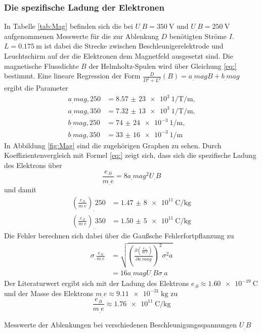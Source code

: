 \subsubsection{Die spezifische Ladung der Elektronen}
In Tabelle \ref{tab:Mag} befinden sich die bei $U_.B=\SI{350}{\volt}$ und $U_.B=\SI{250}{\volt}$ aufgenommenen Messwerte für die zur Ablenkung $D$ benötigten Ströme $I$.
$L=\SI{0,175}{\metre}$\cite{V501} ist dabei die Strecke zwischen Beschleunigerelektrode und Leuchtschirm auf der die Elektronen dem Magnetfeld ausgesetzt sind.
Die magnetische Flussdichte $B$ der Helmholtz-Spulen wird über Gleichung \eqref{eq:} bestimmt.
Eine lineare Regression der Form $\frac{D}{D^2+L^2}(B)=a_.{mag}B+b_.{mag}$ ergibt die Parameter
\begin{align*}
a_.{mag,250}&=\SI{8,57(23)e3}{1\per\tesla\per\metre}\text{,}\\
a_.{mag,350}&=\SI{7,32(13)e3}{1\per\tesla\per\metre}\text{,}\\
b_.{mag,250}&=\SI{74(24)e-3}{1\per\metre}\text{,}\\
b_.{mag,350}&=\SI{33(16)e-3}{1\per\metre}
\end{align*}
In Abbildung \ref{fig:Mag} sind die zugehörigen Graphen zu sehen.
Durch Koeffizientenvergleich mit Formel \eqref{eq:} zeigt sich, dass sich die spezifische Ladung des Elektrons über
\[
\frac{e_.0}{m_.e}=8a_.{mag}^2U_.B
\]
und damit 
\begin{align*}
\left(\frac{e_.0}{m_.e}\right)_.{250}&=\SI{1,47(8)e11}{\coulomb\per\kilogram}\\
\left(\frac{e_.0}{m_.e}\right)_.{350}&=\SI{1,50(5)e11}{\coulomb\per\kilogram}
\end{align*}
Die Fehler berechnen sich dabei über die Gaußsche Fehlerfortpflanzung zu
\begin{align*}
\sigma_.{\frac{e_.0}{m_.e}}&=\sqrt{\left(\frac{\partial\left(\frac{e_.0}{m_.e}\right)}{\partial a_.{mag}}\right)^2\sigma^2_.a}\\
                           &=16a_.{mag}U_.B\sigma_.a
\end{align*}
Der Literaturwert ergibt sich mit der Ladung des Elektrons $e_.0\approx\SI{1,60e-19}{\coulomb}$ und der Masse des Elektrons $m_.e\approx\SI{9,11e-31}{\kilogram}$ zu 
\[
\frac{e_.0}{m_.e}\approx\SI{1,76e11}{\coulomb\per\kilogram}
\]
\begin{table}
\centering
\caption{Messwerte der Ablenkungen bei verschiedenen Beschleunigungsspannungen $U_.B$}

\label{tab:Mag}
\end{table}
